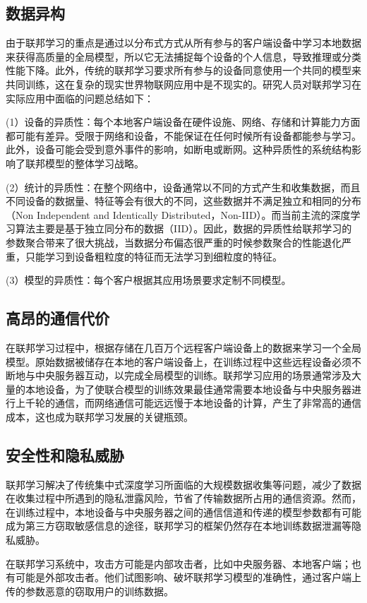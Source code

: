 \subsection{数据异构}
由于联邦学习的重点是通过以分布式方式从所有参与的客户端设备中学习本地数据来获得高质量的全局模型，所以它无法捕捉每个设备的个人信息，导致推理或分类性能下降。此外，传统的联邦学习要求所有参与的设备同意使用一个共同的模型来共同训练，这在复杂的现实世界物联网应用中是不现实的。研究人员对联邦学习在实际应用中面临的问题总结如下：

(1）设备的异质性：每个本地客户端设备在硬件设施、网络、存储和计算能力方面都可能有差异。受限于网络和设备，不能保证在任何时候所有设备都能参与学习。此外，设备可能会受到意外事件的影响，如断电或断网。这种异质性的系统结构影响了联邦模型的整体学习战略。

(2）统计的异质性：在整个网络中，设备通常以不同的方式产生和收集数据，而且不同设备的数据量、特征等会有很大的不同，这些数据并不满足独立和相同的分布（Non Independent and Identically Distributed，Non-IID）。而当前主流的深度学习算法主要是基于独立同分布的数据（IID）。因此，数据的异质性给联邦学习的参数聚合带来了很大挑战，当数据分布偏态很严重的时候参数聚合的性能退化严重，只能学习到设备粗粒度的特征而无法学习到细粒度的特征。

(3）模型的异质性：每个客户根据其应用场景要求定制不同模型。

\subsection{高昂的通信代价}
在联邦学习过程中，根据存储在几百万个远程客户端设备上的数据来学习一个全局模型。原始数据被储存在本地的客户端设备上，在训练过程中这些远程设备必须不断地与中央服务器互动，以完成全局模型的训练。联邦学习应用的场景通常涉及大量的本地设备，为了使联合模型的训练效果最佳通常需要本地设备与中央服务器进行上千轮的通信，而网络通信可能远远慢于本地设备的计算，产生了非常高的通信成本，这也成为联邦学习发展的关键瓶颈。

\subsection{安全性和隐私威胁}
联邦学习解决了传统集中式深度学习所面临的大规模数据收集等问题，减少了数据在收集过程中所遇到的隐私泄露风险，节省了传输数据所占用的通信资源。然而，在训练过程中，本地设备与中央服务器之间的通信信道和传递的模型参数都有可能成为第三方窃取敏感信息的途径，联邦学习的框架仍然存在本地训练数据泄漏等隐私威胁。

在联邦学习系统中，攻击方可能是内部攻击者，比如中央服务器、本地客户端；也有可能是外部攻击者。他们试图影响、破坏联邦学习模型的准确性，通过客户端上传的参数恶意的窃取用户的训练数据。

